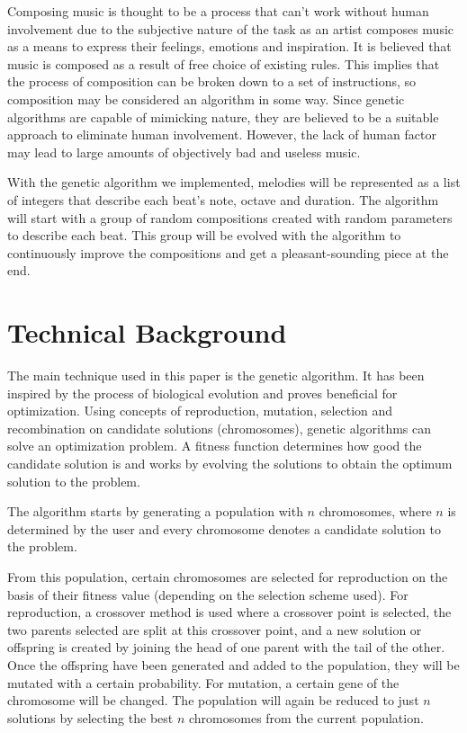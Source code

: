 \documentclass[conference]{IEEEtran}
\begin{document}
Composing music is thought to be a process that can't work without human involvement due to the subjective nature of the task as an artist composes music as a means to express their feelings, emotions and inspiration. It is believed that music is composed as a result of free choice of existing rules. This implies that the process of composition can be broken down to a set of instructions, so composition may be considered an algorithm in some way. Since genetic algorithms are capable of mimicking  nature, they are believed to be a suitable approach to eliminate human involvement. However, the lack of human factor may lead to large amounts of objectively bad and useless music.

With the genetic algorithm we implemented, melodies will be represented as a list of integers that describe each beat's note, octave and duration. The algorithm will start with a group of random compositions created with random parameters to describe each beat. This group will be evolved with the algorithm to continuously improve the compositions and get a pleasant-sounding piece at the end.

\section{Technical Background}
The main technique used in this paper is the genetic algorithm. It has been inspired by the process of biological evolution and proves beneficial for optimization. Using concepts of reproduction, mutation, selection and recombination on candidate solutions (chromosomes), genetic algorithms can solve an optimization problem. A fitness function determines how good the candidate solution is and works by evolving the solutions to obtain the optimum solution to the problem.

The algorithm starts by generating a population with $n$ chromosomes, where $n$ is determined by the user and every chromosome denotes a candidate solution to the problem.

From this population, certain chromosomes are selected for reproduction on the basis of their fitness value (depending on the selection scheme used). For reproduction, a crossover method is used where a crossover point is selected, the two parents selected are split at this crossover point, and a new solution or offspring is created by joining the head of one parent with the tail of the other. Once the offspring have been generated and added to the population, they will be mutated with a certain probability. For mutation, a certain gene of the chromosome will be changed. The population will again be reduced to just $n$ solutions by selecting the best $n$ chromosomes from the current population.
\end{document}

